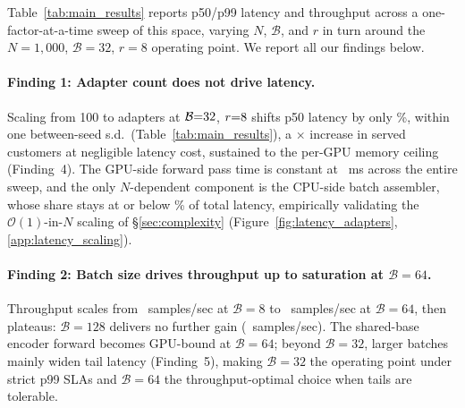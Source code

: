 \documentclass[11pt]{article}
\begin{document}
Table~\ref{tab:main_results} reports p50/p99 latency and throughput
across a one-factor-at-a-time sweep of this space, varying $N$, $\mathcal{B}$,
and $r$ in turn around the $N{=}1{,}000$, $\mathcal{B}{=}32$, $r{=}8$
operating point. We report all our findings below.

\begin{table}[t]
  \centering
  \small
  \setlength{\tabcolsep}{3.4pt}
  \renewcommand{\arraystretch}{0.92}
  \caption{Serving latency (mean$\pm$s.d.\ over \SweepNumSeeds{} seeded
    runs), throughput, and peak GPU memory (setup in \S\ref{sec:setup}).
    The top block sweeps adapter count, the middle batch size, and the
  bottom LoRA rank.}
  \label{tab:main_results}
  
\end{table}

\paragraph{Finding 1: Adapter count does not drive latency.}
Scaling from 100 to \CapacityRankEight{} adapters at
$\mathcal{B}{=}32$, $r{=}8$ shifts p50 latency
by only \PFiftyDriftPctNHundredToFortySevenK\%, within one
between-seed s.d.\ (Table~\ref{tab:main_results}), a
\CustomerMultiplierHundredToFortySevenK$\times$ increase in
served customers at negligible latency cost, sustained to the per-GPU
memory ceiling
(Finding~4).
The GPU-side forward pass time is constant at
\ForwardMsConstantBThirtyTwo~ms across the
entire sweep, and the only $N$-dependent component is the CPU-side batch
assembler, whose share stays at or below
\AssemblePctCeilingBThirtyTwo\% of total
latency, empirically validating the $\mathcal{O}(1)$-in-$N$ scaling of
\S\ref{sec:complexity} (Figure~\ref{fig:latency_adapters},
\ref{app:latency_scaling}).

\paragraph{Finding 2: Batch size drives throughput up to saturation
at $\mathcal{B}{=}64$.}
Throughput scales from \QpsAtBEight~samples/sec at $\mathcal{B}{=}8$
to \QpsAtBSixtyFour~samples/sec at
$\mathcal{B}{=}64$, then plateaus: $\mathcal{B}{=}128$ delivers no
further gain (\QpsAtBOneTwentyEight~samples/sec).
The shared-base encoder forward becomes GPU-bound at $\mathcal{B}{=}64$;
beyond $\mathcal{B}{=}32$, larger batches mainly widen tail latency
(Finding~5), making $\mathcal{B}{=}32$ the operating
point under strict p99 SLAs and $\mathcal{B}{=}64$ the
throughput-optimal choice when tails are tolerable.
\end{document}
